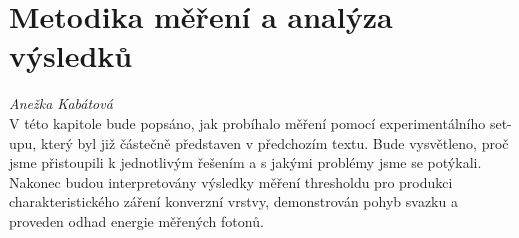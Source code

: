 \newpage
\chapter*{Metodika měření a analýza výsledků} %

\textit{Anežka Kabátová}\\
V této kapitole bude popsáno, jak probíhalo měření pomocí experimentálního set-upu, který byl již částečně představen v předchozím textu. Bude vysvětleno, proč jsme přistoupili k jednotlivým řešením a s jakými problémy jsme se potýkali. Nakonec budou interpretovány výsledky měření thresholdu pro produkci charakteristického záření konverzní vrstvy, demonstrován pohyb svazku a proveden odhad energie měřených fotonů.\\

